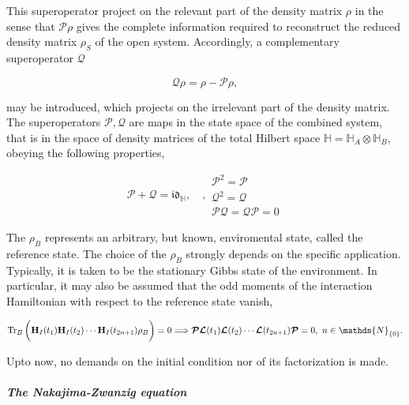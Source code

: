 \documentclass{homework}
\begin{document}
This superoperator project on the relevant part of the density matrix $\rho$ in the sense that $\bm{\mathcal{P}}\rho$ gives the complete information required to reconstruct the reduced density matrix $\rho_S$ of the open system. Accordingly, a complementary superoperator $\bm{\mathcal{Q}}$

\begin{equation}
    \bm{\mathcal{Q}}\rho = \rho - \bm{\mathcal{P}}\rho,
\end{equation}

may be introduced, which projects on the irrelevant part of the density matrix. The superoperators $\bm{\mathcal{P}}, \bm{\mathcal{Q}}$ are maps in the state space of the combined system, that is in the space of density matrices of the total Hilbert space $\mathds{H} = \mathds{H}_A \otimes \mathds{H}_B$, obeying the following properties, 

\begin{equation}
    \bm{\mathcal{P}} + \bm{\mathcal{Q}} = \mathfrak{i}\mathfrak{d}_{\mathds{H}}, \quad,
    \begin{array}{cc}
        \bm{\mathcal{P}}^2 = \bm{\mathcal{P}} \\
        \bm{\mathcal{Q}}^2 = \bm{\mathcal{Q}} \\
         \bm{\mathcal{P}} \bm{\mathcal{Q}} =  \bm{\mathcal{Q}} \bm{\mathcal{P}} = 0
    \end{array}
\end{equation}

The $\rho_B$ represents an arbitrary, but known, enviromental state, called the reference state. The choice of the $\rho_B$ strongly depends on the specific application. Typically, it is taken to be the stationary Gibbs state of the environment. In particular, it may also be assumed that the odd moments of the interaction Hamiltonian with respect to the reference state vanish, 

\begin{equation}
    \Tr_{B} \bigg({\bf H}_I(t_1){\bf H}_I(t_2) \cdots {\bf H}_I(t_{2n+1}) \rho_B \bigg) = 0 \Longrightarrow \bm{\mathcal{P}} \bm{\mathcal{L}}(t_1) \bm{\mathcal{L}}(t_2) \cdots \bm{\mathcal{L}}(t_{2n+1}) \bm{\mathcal{P}} = 0, \blanky n \in \mathds{N}_{{\{0}\}}.
\end{equation} 

Upto now, no demands on the initial condition nor of its factorization is made. \\

\paragraph{\textit{The Nakajima-Zwanzig equation}}
\end{document}
